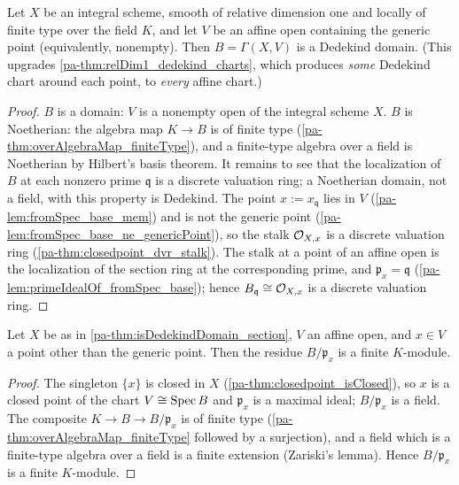 \begin{theorem}
  \label{pa-thm:isDedekindDomain_section}
  \leanok

  Let \(X\) be an integral scheme, smooth of relative dimension one and locally of
  finite type over the field \(K\), and let \(V\) be an affine open containing the
  generic point (equivalently, nonempty). Then \(B = \Gamma(X, V)\) is a Dedekind
  domain. (This upgrades \ref{pa-thm:relDim1_dedekind_charts}, which produces \emph{some}
  Dedekind chart around each point, to \emph{every} affine chart.)
\end{theorem}
\begin{proof}
  \leanok
  \(B\) is a domain: \(V\) is a nonempty open of the integral scheme \(X\). \(B\) is
  Noetherian: the algebra map \(K \to B\) is of finite type
  (\ref{pa-thm:overAlgebraMap_finiteType}), and a finite-type algebra over a field is
  Noetherian by Hilbert's basis theorem. It remains to see that the localization of
  \(B\) at each nonzero prime \(\mathfrak q\) is a discrete valuation ring; a
  Noetherian domain, not a field, with this property is Dedekind. The point
  \(x := x_{\mathfrak q}\) lies in \(V\) (\ref{pa-lem:fromSpec_base_mem}) and is not the
  generic point (\ref{pa-lem:fromSpec_base_ne_genericPoint}), so the stalk
  \(\mathcal{O}_{X,x}\) is a discrete valuation ring (\ref{pa-thm:closedpoint_dvr_stalk}).
  The stalk at a point of an affine open is the localization of the section ring at
  the corresponding prime, and \(\mathfrak p_x = \mathfrak q\)
  (\ref{pa-lem:primeIdealOf_fromSpec_base}); hence \(B_{\mathfrak q} \cong
  \mathcal{O}_{X,x}\) is a discrete valuation ring.
\end{proof}

\begin{theorem}
  \label{pa-thm:moduleFinite_quotient_primeIdealOf}
  \leanok

  Let \(X\) be as in \ref{pa-thm:isDedekindDomain_section}, \(V\) an affine open, and
  \(x \in V\) a point other than the generic point. Then the residue
  \(B/\mathfrak p_x\) is a finite \(K\)-module.
\end{theorem}
\begin{proof}
  \leanok
  The singleton \(\{x\}\) is closed in \(X\) (\ref{pa-thm:closedpoint_isClosed}), so
  \(x\) is a closed point of the chart \(V \cong \operatorname{Spec} B\) and \(\mathfrak p_x\) is a
  maximal ideal; \(B/\mathfrak p_x\) is a field. The composite
  \(K \to B \to B/\mathfrak p_x\) is of finite type
  (\ref{pa-thm:overAlgebraMap_finiteType} followed by a surjection), and a field which is
  a finite-type algebra over a field is a finite extension (Zariski's lemma). Hence
  \(B/\mathfrak p_x\) is a finite \(K\)-module.
\end{proof}

